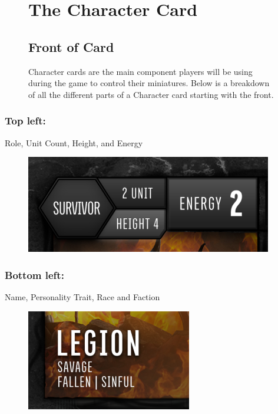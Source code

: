 \documentclass[../main.tex]{subfiles}
\begin{document}
\begin{figure}[!t]
   \section{The Character Card}
   \subsection{Front of Card}
    \normalsize Character cards are the main component players will be using during the game to control their miniatures. Below is a breakdown of all the different parts of a Character card starting with the front. 
    \tsgap
\end{figure}

\subsubsection{Top left:}
Role, Unit Count, Height, and Energy
\begin{figure}[ht]
    \includegraphics[width=0.8\linewidth]{chapters/charactercard/TimeStrikeCharCardTopLeft.png}
\end{figure}

\subsubsection{Bottom left:}
Name, Personality Trait, Race and Faction

\begin{figure}[ht]
    \includegraphics[width=0.8\linewidth]{chapters/charactercard/TimeStrikeCharCardBottomLeft.png}
\end{figure}
\end{document}
